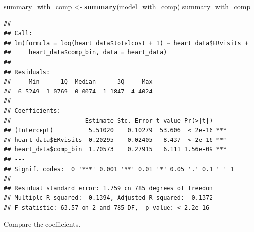 \documentclass[
]{article}
\newenvironment{Shaded}{\begin{snugshade}}{\end{snugshade}}
\newcommand{\CommentTok}[1]{\textcolor[rgb]{0.56,0.35,0.01}{\textit{#1}}}
\newcommand{\DecValTok}[1]{\textcolor[rgb]{0.00,0.00,0.81}{#1}}
\newcommand{\FunctionTok}[1]{\textcolor[rgb]{0.13,0.29,0.53}{\textbf{#1}}}
\newcommand{\NormalTok}[1]{#1}
\newcommand{\OtherTok}[1]{\textcolor[rgb]{0.56,0.35,0.01}{#1}}
\newcommand{\SpecialCharTok}[1]{\textcolor[rgb]{0.81,0.36,0.00}{\textbf{#1}}}
\newcommand{\StringTok}[1]{\textcolor[rgb]{0.31,0.60,0.02}{#1}}
\begin{document}
\begin{Shaded}
\begin{Highlighting}[]
\NormalTok{summary\_with\_comp }\OtherTok{\textless{}{-}} \FunctionTok{summary}\NormalTok{(model\_with\_comp)}
\NormalTok{summary\_with\_comp}
\end{Highlighting}
\end{Shaded}

\begin{verbatim}
## 
## Call:
## lm(formula = log(heart_data$totalcost + 1) ~ heart_data$ERvisits + 
##     heart_data$comp_bin, data = heart_data)
## 
## Residuals:
##     Min      1Q  Median      3Q     Max 
## -6.5249 -1.0769 -0.0074  1.1847  4.4024 
## 
## Coefficients:
##                     Estimate Std. Error t value Pr(>|t|)    
## (Intercept)          5.51020    0.10279  53.606  < 2e-16 ***
## heart_data$ERvisits  0.20295    0.02405   8.437  < 2e-16 ***
## heart_data$comp_bin  1.70573    0.27915   6.111 1.56e-09 ***
## ---
## Signif. codes:  0 '***' 0.001 '**' 0.01 '*' 0.05 '.' 0.1 ' ' 1
## 
## Residual standard error: 1.759 on 785 degrees of freedom
## Multiple R-squared:  0.1394, Adjusted R-squared:  0.1372 
## F-statistic: 63.57 on 2 and 785 DF,  p-value: < 2.2e-16
\end{verbatim}

Compare the coefficients.

\begin{Shaded}
\end{Shaded}
\end{document}
